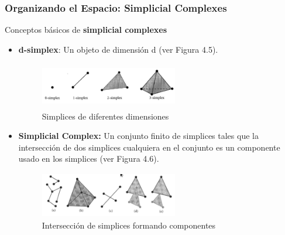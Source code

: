 \documentclass[a4paper,12pt,oneside]{report}
\begin{document}
\subsubsection*{Organizando el Espacio: Simplicial Complexes}
Conceptos b\'asicos de \textbf{simplicial complexes}
\begin{itemize}
\item \textbf{d-simplex}: Un objeto de dimensi\'on d (ver Figura 4.5).
\begin{figure}[h]\center
\includegraphics[width=6cm,height=2cm]{Imagenes/2.png}
\caption{Simplices de diferentes dimensiones}\end{figure}
\item \textbf{Simplicial Complex:} Un conjunto finito de simplices tales que la intersecci\'on de dos simplices cualquiera en el conjunto es un componente usado en los simplices (ver Figura 4.6).
\begin{figure}[h]\center \includegraphics[width=6cm,height=2cm]{Imagenes/3.png} \caption{Intersecci\'on de simplices formando componentes}\end{figure}
\end{itemize}
\end{document}
